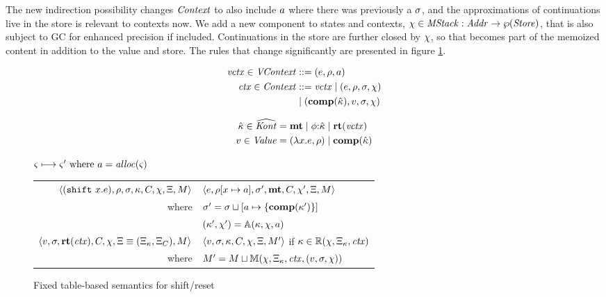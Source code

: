 The new indirection possibility changes $\mathit{Context}$ to also include $a$ where there was previously a $\sigma$, and the approximations of continuations live in the store is relevant to contexts now.
%
We add a new component to states and contexts, $\chi \in \mathit{MStack} : \mathit{Addr} \to \wp(\mathit{Store})$, that is also subject to GC for enhanced precision if included.
%
Continuations in the store are further closed by $\chi$, so that becomes part of the memoized content in addition to the value and store.
%
The rules that change significantly are presented in figure \ref{fig:shift-reset-table1}.

\begin{center}
  \begin{minipage}{0.50\linewidth}
    \begin{align*}
      \mathit{vctx} \in \mathit{VContext} &::= (e,\rho,a) \\
      \mathit{ctx} \in \mathit{Context} &::= \mathit{vctx} \mathrel{\mid}
      (e,\rho,\sigma,\chi) \\ &\mathrel{\mid} (\mathbf{comp}(\hat{\kappa}),
      v, \sigma, \chi)
    \end{align*}
  \end{minipage}
  \begin{minipage}{0.45\linewidth}
    \begin{align*}
      \hat{\kappa} \in \widehat{\mathit{Kont}} &= \mathbf{mt} \mathrel{\mid} \phi{\tt :} \hat{\kappa} \mathrel{\mid} \mathbf{rt}(\mathit{vctx}) \\
      v \in \mathit{Value} &= (\lambda{} x. e, \rho) \mathrel{\mid}
      \mathbf{comp}(\hat{\kappa})
    \end{align*}
  \end{minipage}
\end{center}

\begin{figure}
  \centering
  $\varsigma \longmapsto \varsigma' \text{ where } a = \mathit{alloc}(\varsigma)$ \\
  \begin{tabular}{r|l}
    \hline
    $\langle (\texttt{shift}\ x. e), \rho, \sigma, \kappa, C, \chi, \Xi, M \rangle$
    &
    $\langle e, \rho[x \mapsto a], \sigma',\mathbf{mt},C, \chi', \Xi,M \rangle$
    \\
    where & $\sigma' = \sigma\sqcup[a \mapsto \{ \mathbf{comp}(\kappa') \}]$ \\
    & $(\kappa',\chi') = {\mathbb A}(\kappa, \chi, a)$
\\
   $\langle v, \sigma, \mathbf{rt}(\mathit{ctx}), C, \chi, \Xi\equiv(\Xi_\kappa,\Xi_C), M \rangle$
   &
   $\langle v, \sigma, \kappa, C, \chi, \Xi, M' \rangle$
   if $\kappa \in {\mathbb R}(\chi, \Xi_\kappa, \mathit{ctx})$
   \\
   where & $M' = M \sqcup {\mathbb M}(\chi, \Xi_\kappa, \mathit{ctx}, (v, \sigma, \chi))$
  \end{tabular}
  \caption{Fixed table-based semantics for shift/reset}
  \label{fig:shift-reset-table1}
\end{figure}

